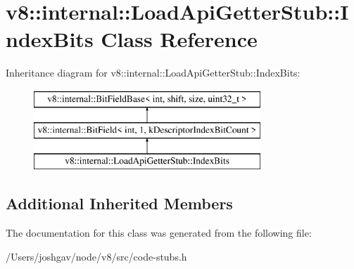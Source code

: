 \hypertarget{classv8_1_1internal_1_1_load_api_getter_stub_1_1_index_bits}{}\section{v8\+:\+:internal\+:\+:Load\+Api\+Getter\+Stub\+:\+:Index\+Bits Class Reference}
\label{classv8_1_1internal_1_1_load_api_getter_stub_1_1_index_bits}
Inheritance diagram for v8\+:\+:internal\+:\+:Load\+Api\+Getter\+Stub\+:\+:Index\+Bits\+:\begin{figure}[H]
\begin{center}
\leavevmode
\includegraphics[height=3.000000cm]{classv8_1_1internal_1_1_load_api_getter_stub_1_1_index_bits}
\end{center}
\end{figure}
\subsection*{Additional Inherited Members}


The documentation for this class was generated from the following file\+:\begin{DoxyCompactItemize}
\item 
/\+Users/joshgav/node/v8/src/code-\/stubs.\+h\end{DoxyCompactItemize}
